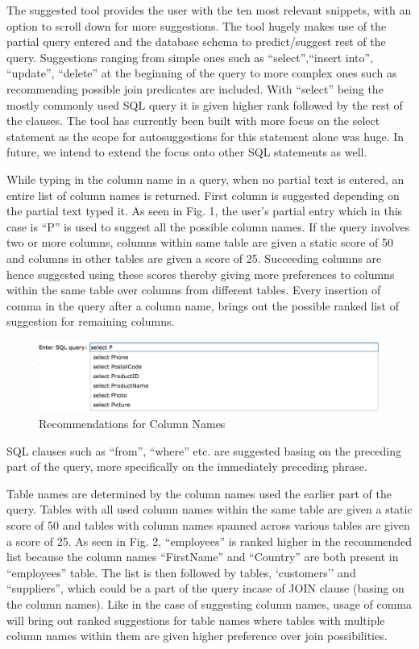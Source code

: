\documentclass{acm_proc_article-sp}
\begin{document}
The suggested tool provides the user with the ten most relevant snippets, with an option to scroll down for more suggestions. The tool hugely makes use of the partial query entered and the database schema to predict/suggest rest of the query. Suggestions ranging from simple ones such as ``select'',``insert into'', ``update'', ``delete'' at the beginning of the query to more complex ones such as recommending possible join predicates are included. With ``select'' being the mostly commonly used SQL query it is given higher rank followed by the rest of the clauses. The tool has currently been built with more focus on the select statement as the scope for autosuggestions for this statement alone was huge. In future, we intend to extend the focus onto other SQL statements as well.

While typing in the column name in a query, when no partial text is entered, an entire list of column names is returned. First column is suggested depending on the partial text typed it. As seen in Fig. 1, the user's partial entry which in this case is ``P'' is used to suggest all the possible column names.  If the query involves two or more columns, columns within same table are given a static score of 50 and columns in other tables are given a score of 25. Succeeding columns are hence suggested using these scores thereby giving more preferences to columns within the same table over columns from different tables. Every insertion of comma in the query after a column name, brings out the possible ranked list of suggestion for remaining columns.

\begin{figure}
\centering
\includegraphics[width=170mm]{column_names.png}
\caption{Recommendations for Column Names}
\label{overflow}
\end{figure}

SQL clauses such as ``from'', ``where'' etc. are suggested basing on the preceding part of the query, more specifically on the immediately preceding phrase.

Table names are determined by the column names used the earlier part of the query. Tables with all used column names within the same table are given a static score of 50 and tables with column names spanned across various tables are given a score of 25. As seen in Fig. 2, ``employees'' is ranked higher in the recommended list because the column names ``FirstName'' and ``Country'' are both present in ``employees'' table. The list is then followed by tables, `customers'' and ``suppliers'', which could be a part of the query incase of JOIN clause (basing on the column names). Like in the case of suggesting column names, usage of comma will bring out ranked suggestions for table names where tables with multiple column names within them are given higher preference over join possibilities.
\end{document}
